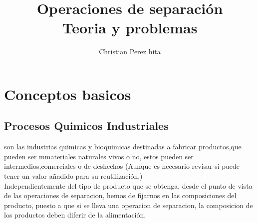 \documentclass{report}
\title{\Huge{Operaciones de separación}\\Teoria y problemas}
\author{\huge{Christian Perez hita}}
\date{}
\begin{document}
\setcounter{tocdepth}{3}
\maketitle
\newpage%

\tableofcontents
\pagebreak

\chapter{Conceptos basicos}
\section{Procesos Quimicos Industriales}
\begin{raggedright}
	son las industrias quimicas y bioquimicas destinadas a fabricar productos,que pueden ser mmateriales naturales vivos o no, 
	estos pueden ser intermedios,comerciales o de deshechos (Aunque es necesario revisar si puede tener un valor añadido para su reutilización.)\\
\vspace{1\baselineskip}
Independientemente del tipo de producto que se obtenga, desde el punto de vista de las operaciones de separacion, hemos de fijarnos en las composiciones
del producto, puesto a que si se lleva una operacion de separacion, la composicion de los productos deben diferir de la alimentación.\\


\end{raggedright}
\end{document}
